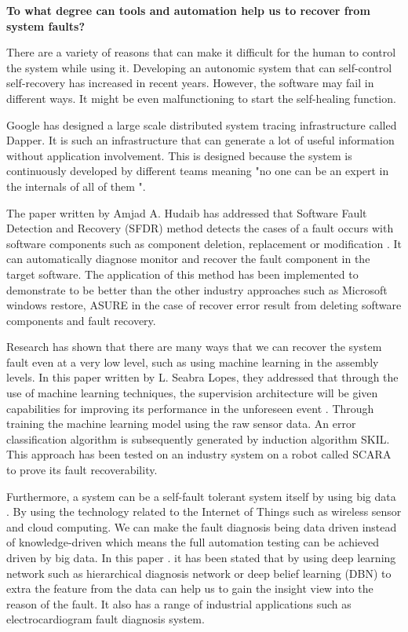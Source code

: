 \documentclass[12pt]{article}
\begin{document}
\pagestyle{empty}

{\bf To what degree can tools and automation help us to recover from system faults?}

There are a variety of reasons that can make it difficult for the human to control the system while using it. Developing an autonomic system that can self-control self-recovery has increased in recent years. However, the software may fail in different ways. It might be even malfunctioning to start the self-healing function. 

Google has designed a large scale distributed system tracing infrastructure called Dapper. It is such an infrastructure that can generate a lot of useful information without application involvement. This is designed because the system is continuously developed by different teams meaning "no one can be an expert in the internals of all of them \cite{ct1}". 

The paper written by Amjad A. Hudaib has addressed that Software Fault Detection and Recovery (SFDR) method detects the cases of a fault occurs with software components such as component deletion, replacement or modification \cite{ct2}. It can automatically diagnose monitor and recover the fault component in the target software. The application of this method has been implemented to demonstrate to be better than the other industry approaches such as Microsoft windows restore, ASURE in the case of recover error result from deleting software components and fault recovery.

Research has shown that there are many ways that we can recover the system fault even at a very low level, such as using machine learning in the assembly levels. In this paper written by L. Seabra Lopes, they addressed that through the use of machine learning techniques, the supervision architecture will be given capabilities for improving its performance in the unforeseen event \cite{ct3}. Through training the machine learning model using the raw sensor data. An error classification algorithm is subsequently generated by induction algorithm SKIL. This approach has been tested on an industry system on a robot called SCARA to prove its fault recoverability.

Furthermore, a system can be a self-fault tolerant system itself by using big data \cite{ct4}. By using the technology related to the Internet of Things such as wireless sensor and cloud computing. We can make the fault diagnosis being data driven instead of knowledge-driven which means the full automation testing can be achieved driven by big data. In this paper \cite{ct4}. it has been stated that by using deep learning network such as hierarchical diagnosis network or deep belief learning (DBN) to extra the feature from the data can help us to gain the insight view into the reason of the fault. It also has a range of industrial applications such as electrocardiogram fault diagnosis system.
\end{document}
